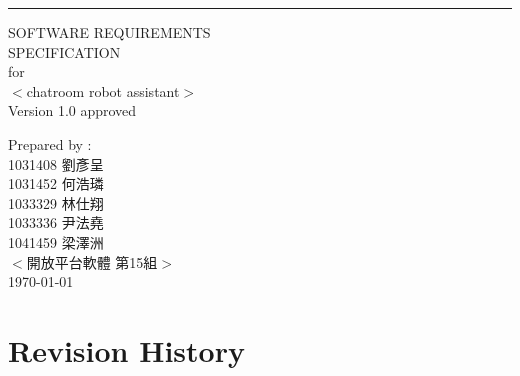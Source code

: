 \documentclass{scrreprt}
\date{}
\def\myversion{1.0 }
\begin{document}
\begin{flushright}
    \rule{16cm}{5pt}\vskip1cm
    \begin{bfseries}
        \Huge{SOFTWARE REQUIREMENTS\\ SPECIFICATION}\\
        \vspace{1.9cm}
        for\\
        \vspace{1.0cm}
        $<$chatroom robot assistant$>$\\
        \vspace{1.0cm}
        \LARGE{Version \myversion approved}\\
        \vspace{1.0cm}
	\begin{CJK}{UTF8}{bkai}
        		 Prepared by :  \\
	   	1031408 劉彥呈\\
	   	1031452 何浩璘\\
	   	1033329 林仕翔\\
	   	1033336 尹法堯\\
        		1041459 梁澤洲\\
        \vspace{1.0cm}
        $<$開放平台軟體 第15組$>$\\
        \vspace{1.0cm}
        \today\\
	\end{CJK}
    \end{bfseries}
\end{flushright}

\tableofcontents


\chapter*{Revision History}
\end{document}
